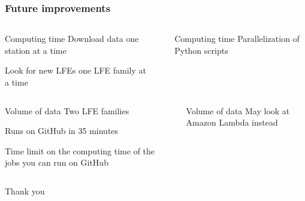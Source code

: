 \documentclass{beamer}
\begin{document}
	\begin{frame}
		\frametitle{Future improvements}
		\begin{columns}[c]
			\begin{column}{5cm}
				\begin{block}{Computing time}
				Download data one station at a time

				Look for new LFEs one LFE family at a time
				\end{block}
			\end{column}
			\begin{column}{1cm}
				\centering
				\Huge\pointer
			\end{column}
			\begin{column}{5cm}
				\begin{block}{Computing time}
				Parallelization of Python scripts
				\end{block}
			\end{column}
		\end{columns}

		\vspace{1cm}

		\begin{columns}[c]
			\begin{column}{5cm}
				\begin{block}{Volume of data}
				Two LFE families

				Runs on GitHub in 35 minutes

				Time limit on the computing time of the jobs you can run on GitHub
				\end{block}
			\end{column}
			\begin{column}{1cm}
				\centering
				\Huge\pointer
			\end{column}
			\begin{column}{5cm}
				\begin{block}{Volume of data}
				May look at Amazon Lambda instead
				\end{block}
			\end{column}
		\end{columns}
	\end{frame}

	\begin{frame}
		\centering
		\Huge{Thank you}
	\end{frame}
\end{document}
